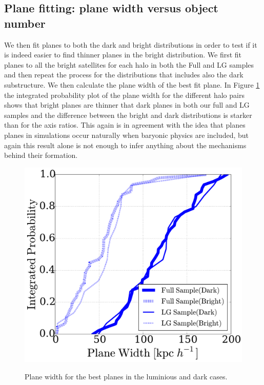 \subsection{Plane fitting: plane width versus object number}
\label{DarkBright}
We then fit planes to both the dark and bright distributions in order to test if it is indeed easier to find thinner planes in the bright distribution. 
We first fit planes to all the bright satellites for each halo in both the Full and LG samples and then repeat the process for the distributions that includes also the dark substructure.
We then calculate the plane width of the best fit plane. %
In Figure \ref{fig:plane_width} the integrated probability plot of the plane width for the different halo pairs shows that bright planes are thinner that dark planes in both our full and LG samples and the difference between the bright and dark distributions is starker than for the axis ratios. 
This again is in agreement with the idea that planes planes in simulations occur naturally when baryonic physics are included, but again this result alone is not enough to infer anything about the mechanisms behind their formation.\\ 

\begin{figure}
\includegraphics[width=\hsize]{plane_width.pdf}\\
\caption{Plane width for the best planes in the luminious and dark cases.}
\label{fig:plane_width}
\end{figure}

